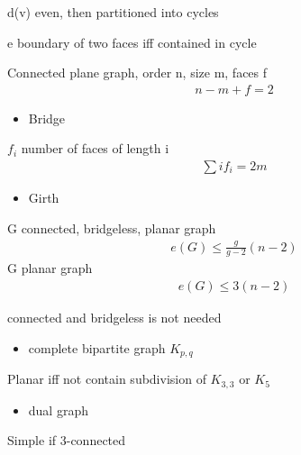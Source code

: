\begin{lemma}
    d(v) even, then partitioned into cycles
\end{lemma}

\begin{lemma}
    e boundary of two faces iff contained in cycle
\end{lemma}

\begin{thm}[Euler]
    Connected plane graph, order n, size m, faces f
    \begin{align*}
        n - m + f = 2
    \end{align*}
\end{thm}

\begin{itemize}
    \item Bridge
\end{itemize}
%
\begin{fact}
    $f_i$ number of faces of length i
    \begin{align*}
        \sum i f_i = 2m
    \end{align*}
\end{fact}

\begin{itemize}
    \item Girth
\end{itemize}

\begin{thm}
    G connected, bridgeless, planar graph
    \begin{align*}
        e(G) \leq \frac{g}{g-2}(n-2)
    \end{align*}
    G planar graph
    \begin{align*}
        e(G) \leq 3(n -2)
    \end{align*}
\end{thm}

\begin{fact}
    connected and bridgeless is not needed
\end{fact}

\begin{itemize}
    \item complete bipartite graph $K_{p,q}$
\end{itemize}

\begin{thm}[Kuratowski]
    Planar iff not contain subdivision of $K_{3,3}$ or $K_5$
\end{thm}

\begin{itemize}
    \item dual graph
\end{itemize}

\begin{fact}
    Simple if 3-connected
\end{fact}